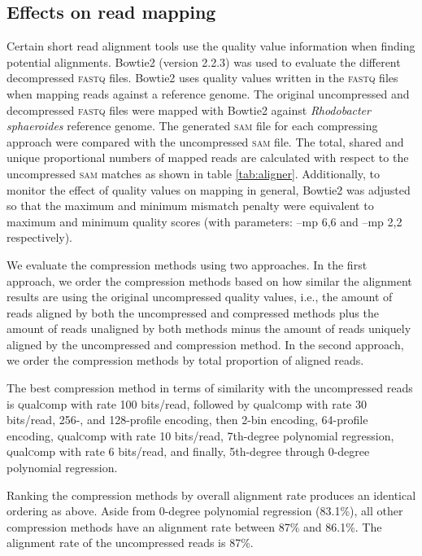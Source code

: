 \documentclass{bioinfo}
\begin{document}
\subsection{Effects on read mapping}

Certain short read alignment tools use the quality value
information when finding potential alignments. Bowtie2 (version 2.2.3)
was used to evaluate the different decompressed \textsc{fastq}
files. Bowtie2 uses quality values written in the \textsc{fastq} files
when mapping reads against a reference genome. The original
uncompressed and decompressed \textsc{fastq} files were mapped with
Bowtie2 against \textit{Rhodobacter sphaeroides} reference genome. The
generated \textsc{sam} file for each compressing approach were
compared with the uncompressed \textsc{sam} file. The total, shared
and unique proportional numbers of mapped reads are calculated with
respect to the uncompressed \textsc{sam} matches as shown in table
\ref{tab:aligner}. Additionally, to monitor the effect of quality
values on mapping in general, Bowtie2 was adjusted so that the maximum
and minimum mismatch penalty were equivalent to maximum and minimum
quality scores (with parameters: --mp 6,6 and --mp 2,2 respectively).

We evaluate the compression methods using two approaches. In the
first approach, we order the compression methods based on how similar
the alignment results are using the original uncompressed quality values, i.e., the
amount of reads aligned by both the uncompressed and compressed
methods plus the amount of reads unaligned by both methods minus the
amount of reads uniquely aligned by the uncompressed and compression
method. In the second approach, we order the compression methods by
total proportion of aligned reads.

The best compression method in terms of similarity with the
uncompressed reads is \textsc{q}ual\textsc{c}omp with rate 100 bits/read, followed by
\textsc{q}ual\textsc{c}omp with rate 30 bits/read, 256-, and 128-profile encoding, then
2-bin encoding, 64-profile encoding, \textsc{q}ual\textsc{c}omp with rate 10 bits/read,
7th-degree polynomial regression, \textsc{q}ual\textsc{c}omp with rate 6 bits/read, and
finally, 5th-degree through 0-degree polynomial regression.

Ranking the compression methods by overall alignment rate produces an
identical ordering as above. Aside from 0-degree polynomial
regression (83.1\%), all other compression methods have an alignment
rate between 87\% and 86.1\%. The alignment rate of the uncompressed
reads is 87\%.
\end{document}
